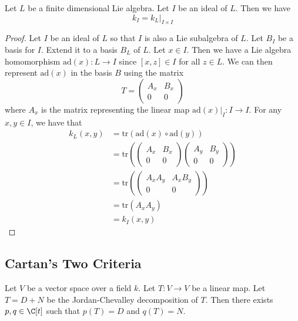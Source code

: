 \documentclass[a4paper]{article}
\begin{document}
\begin{lmm}{}{} Let $L$ be a finite dimensional Lie algebra. Let $I$ be an ideal of $L$. Then we have $$k_I=k_L|_{I\times I}$$ \tcbline
\begin{proof}
Let $I$ be an ideal of $L$ so that $I$ is also a Lie subalgebra of $L$. Let $B_I$ be a basis for $I$. Extend it to a basis $B_L$ of $L$. Let $x\in I$. Then we have a Lie algebra homomorphism $\text{ad}(x):L\to I$ since $[x,z]\in I$ for all $z\in L$. We can then represent $\text{ad}(x)$ in the basis $B$ using the matrix $$T=\begin{pmatrix}
A_x & B_x\\
0 & 0
\end{pmatrix}$$ where $A_x$ is the matrix representing the linear map $\text{ad}(x)|_I:I\to I$. For any $x,y\in I$, we have that 
\begin{align*}
k_L(x,y)&=\text{tr}(\text{ad}(x)\circ\text{ad}(y))\\
&=\text{tr}\left(\begin{pmatrix}
A_x & B_x\\
0 & 0
\end{pmatrix}\begin{pmatrix}
A_y & B_y\\
0 & 0
\end{pmatrix}\right)\\
&=\text{tr}\left(\begin{pmatrix}
A_xA_y & A_xB_y\\
0 & 0
\end{pmatrix}\right)\\
&=\text{tr}(A_xA_y)\\
&=k_I(x,y)
\end{align*}
\end{proof}
\end{lmm}

\subsection{Cartan's Two Criteria}
\begin{lmm}{}{} Let $V$ be a vector space over a field $k$. Let $T:V\to V$ be a linear map. Let $T=D+N$ be the Jordan-Chevalley decomposition of $T$. Then there exists $p,q\in\C[t]$ such that $p(T)=D$ and $q(T)=N$. 
\end{lmm}
\end{document}
